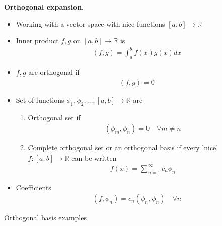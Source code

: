 \documentclass[12pt, letterpaper]{article}
\begin{document}
\textbf{Orthogonal expansion}. 
\begin{itemize}
    \item Working with a vector space with nice functions $[a,b] \rightarrow \mathbb{R}$
    \item Inner product $f,g$ on $[a,b]\rightarrow \mathbb{R}$ is 
    \begin{align*}
        (f,g) = \int_{a}^{b}f(x)g(x)dx
    \end{align*}
    \item $f,g$ are orthogonal if 
    \begin{align*}
        (f,g) = 0
    \end{align*}
    \item Set of functions $\phi_1, \phi_2, \dots : [a,b] \rightarrow \mathbb{R}$ are
    \begin{enumerate}
        \item Orthogonal set if \begin{align*}
            (\phi_m,\phi_n) = 0 \quad \forall m\ne n
        \end{align*}
        \item Complete orthogonal set or an orthogonal basis if every 'nice' 
        $f:[a,b] \rightarrow \mathbb{R}$ can be written 
        \begin{align*}
            f(x) = \sum_{n=1}^{\infty} c_n \phi_n
        \end{align*}
    \end{enumerate}
    \item Coefficients
    \begin{align*}
        (f,\phi_n) = c_n(\phi_n, \phi_n) \quad \forall n
    \end{align*}
\end{itemize}
\underline{Orthogonal basis examples}
\end{document}
